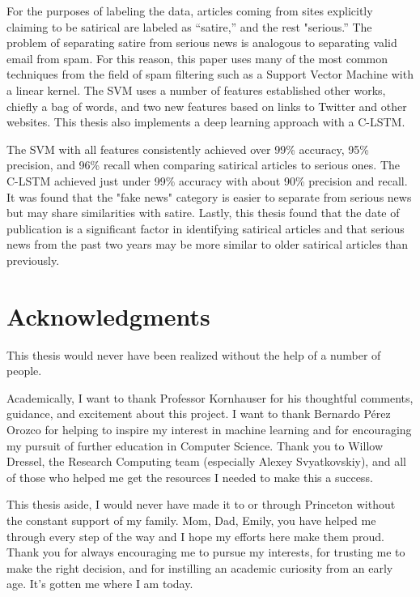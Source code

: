 \documentclass [12 pt] {report}
\begin{document}
For the purposes of labeling the data, articles coming from sites explicitly claiming to be satirical are labeled as “satire,” and the rest "serious.” The problem of separating satire from serious news is analogous to separating valid email from spam. For this reason, this paper uses many of the most common techniques from the field of spam filtering such as a Support Vector Machine with a linear kernel. The SVM uses a number of features established other works, chiefly a bag of words, and two new features based on links to Twitter and other websites. This thesis also implements a deep learning approach with a C-LSTM.

The SVM with all features consistently achieved over 99\% accuracy, 95\% precision, and 96\% recall when comparing satirical articles to serious ones. The C-LSTM achieved just under 99\% accuracy with about 90\% precision and recall. It was found that the "fake news" category is easier to separate from serious news but may share similarities with satire. Lastly, this thesis found that the date of publication is a significant factor in identifying satirical articles and that serious news from the past two years may be more similar to older satirical articles than previously.

\newpage
\thispagestyle{plain}
\section*{Acknowledgments}
 \onehalfspacing

This thesis would never have been realized without the help of a number of people.

\vspace{3mm}

Academically, I want to thank Professor Kornhauser for his thoughtful comments, guidance, and excitement about this project. I want to thank Bernardo P{\'e}rez Orozco for helping to inspire my interest in machine learning and for encouraging my pursuit of further education in Computer Science. Thank you to Willow Dressel, the Research Computing team (especially Alexey Svyatkovskiy), and all of those who helped me get the resources I needed to make this a success.

\vspace{3mm}

This thesis aside, I would never have made it to or through Princeton without the constant support of my family. Mom, Dad, Emily, you have helped me through every step of the way and I hope my efforts here make them proud. Thank you for always encouraging me to pursue my interests, for trusting me to make the right decision, and for instilling an academic curiosity from an early age. It's gotten me where I am today.
\end{document}
